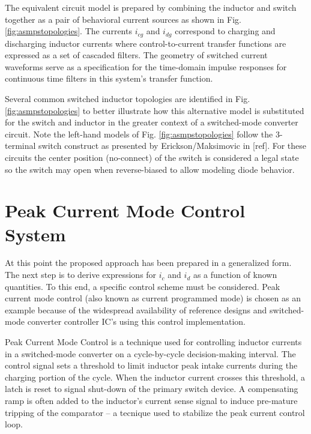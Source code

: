 \documentclass[conference]{IEEEtran}
\begin{document}
The equivalent circuit model is prepared by combining the inductor and switch together as a pair of behavioral current sources as shown in Fig. \ref{fig:asmpstopologies}. The currents $i_{cg}$ and $i_{dg}$ correspond to charging and discharging inductor currents where control-to-current transfer functions are expressed as a set of cascaded filters.  The geometry of switched current waveforms serve as a specification for the time-domain impulse responses for continuous time filters in this system's transfer function.

Several common switched inductor topologies are identified in Fig. \ref{fig:asmpstopologies} to better illustrate how this alternative model is substituted for the switch and inductor in the greater context of a switched-mode converter circuit.  Note the left-hand models of Fig. \ref{fig:asmpstopologies} follow the 3-terminal switch construct as presented by Erickson/Maksimovic in [ref].  For these circuits the center position (no-connect) of the switch is considered a legal state so the switch may open when reverse-biased to allow modeling diode behavior.

\section{Peak Current Mode Control System}
At this point the proposed approach has been prepared in a generalized form. The next step is to derive expressions for $i_c$ and $i_d$ as a function of known quantities. To this end, a specific control scheme must be considered. Peak current mode control (also known as current programmed mode) is chosen as an example because of the widespread availability of reference designs and switched-mode converter controller IC's using this control implementation.

Peak Current Mode Control is a technique used for controlling inductor currents in a switched-mode converter on a cycle-by-cycle decision-making interval. The control signal sets a threshold to limit inductor peak intake currents during the charging portion of the cycle. When the inductor current crosses this threshold, a latch is reset to signal shut-down of the primary switch device. A compensating ramp is often added to the inductor's current sense signal to induce pre-mature tripping of the comparator -- a tecnique used to stabilize the peak current control loop.
\end{document}
